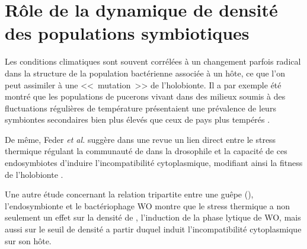 \section{Rôle de la dynamique de densité des populations symbiotiques}

Les conditions climatiques sont souvent corrélées à un changement parfois radical dans la structure de la population bactérienne associée à un hôte, ce que l'on peut assimiler à une <<~mutation~>> de l'holobionte.
Il a par exemple été montré que les populations de pucerons vivant dans des milieux soumis à des fluctuations régulières de température présentaient une prévalence de leurs symbiontes secondaires bien plus élevés que ceux de pays plus tempérés \cite{harmon2009}.

De même, Feder \textit{et al.} suggère dans une revue un lien direct entre le stress thermique régulant la communauté de  dans la drosophile et la capacité de ces endosymbiotes d'induire l'incompatibilité cytoplasmique, modifiant ainsi la fitness de l'holobionte \cite{feder1999}. 

Une autre étude \cite{bordenstein2011} concernant la relation tripartite entre une guêpe (), l'endosymbionte  et le bactériophage WO montre que le stress thermique a non seulement un effet sur la densité de , l'induction de la phase lytique de WO, mais aussi sur le seuil de densité a partir duquel  induit l'incompatibilité cytoplasmique sur son hôte.

